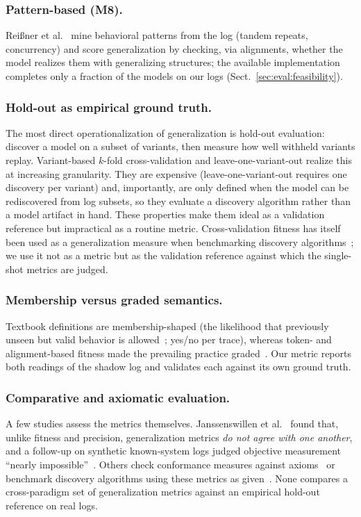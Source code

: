 \documentclass[runningheads]{llncs}
\newcommand{\chg}[1]{\textcolor{chgblue}{#1}}
\begin{document}
\subsubsection{Pattern-based (M8).}
\chg{Rei{\ss}ner et al.~\cite{reissner2022pattern} mine behavioral patterns from the log (tandem repeats, concurrency) and score generalization by checking, via alignments, whether the model realizes them with generalizing structures;} the available implementation completes only a fraction of the models on our logs (Sect.~\ref{sec:eval:feasibility}).

\subsubsection{Hold-out as empirical ground truth.}
The most direct operationalization of generalization is hold-out evaluation: discover a model on a subset of variants, then measure how well withheld variants replay. Variant-based $k$-fold cross-validation and leave-one-variant-out realize this at increasing granularity. They are expensive (leave-one-variant-out requires one discovery per variant) and, importantly, are only defined when the model can be rediscovered from log subsets, so they evaluate a discovery algorithm rather than a model artifact in hand. These properties make them ideal as a validation reference but impractical as a routine metric. \chg{Cross-validation fitness has itself been used as a generalization measure when benchmarking discovery algorithms~\cite{augusto2019benchmark}; we use it not as a metric but as the validation reference against which the single-shot metrics are judged.}

\subsubsection{Membership versus graded semantics.}
Textbook definitions are membership-shaped \chg{(the likelihood that previously unseen but valid behavior is allowed~\cite{vanderaalst2016pm}; yes/no per trace)}, whereas token- and alignment-based fitness made the prevailing practice graded~\cite{rozinat2008conformance}. Our metric reports both readings of the shadow log and validates each against its own ground truth.

\subsubsection{Comparative and axiomatic evaluation.}
A few studies assess the metrics themselves. Janssenswillen et al.~\cite{janssenswillen2017comparative} found that, unlike fitness and precision, generalization metrics \emph{do not agree with one another}, and a follow-up on synthetic known-system logs judged objective measurement ``nearly impossible''~\cite{janssenswillen2019confirmatory}. Others check conformance measures against axioms~\cite{vanderaalst2018propositions,syring2019conformance} or benchmark discovery algorithms using these metrics as given~\cite{augusto2019benchmark}. None compares a cross-paradigm set of generalization metrics against an empirical hold-out reference on real logs.
\end{document}
